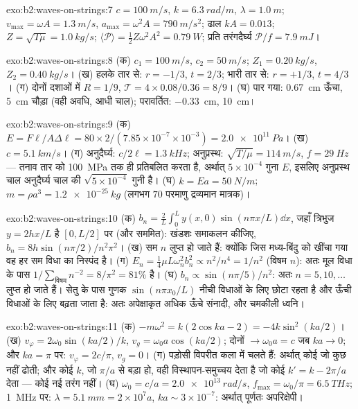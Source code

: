 \begin{solution}{exo:b2:waves-on-strings:7}
$c = \qty{100}{m/s}$, $k = \qty{6.3}{rad/m}$, $\lambda = \qty{1.0}{m}$; $v_{\max} = \omega A =
\qty{1.3}{m/s}$, $a_{\max} = \omega^2A = \qty{790}{m/s^2}$; ढाल $kA = 0.013$; $Z =
\sqrt{T\mu} = \qty{1.0}{kg/s}$; $\langle\mathcal P\rangle = \tfrac12Z\omega^2A^2 = \qty{0.79}{W}$;
प्रति तरंगदैर्घ्य $\mathcal P/f = \qty{7.9}{mJ}$।
\end{solution}

\begin{solution}{exo:b2:waves-on-strings:8}
(क) $c_1 = \qty{100}{m/s}$, $c_2 = \qty{50}{m/s}$; $Z_1 = \qty{0.20}{kg/s}$, $Z_2 = \qty{0.40}{kg/s}$।
(ख) हलके तार से: $r = -1/3$, $t = 2/3$; भारी तार से: $r =
+1/3$, $t = 4/3$। (ग) दोनों दशाओं में $R = 1/9$, $\mathcal T = 4 \times 0.08/0.36 = 8/9$।
(घ) पार गया: \qty{0.67}{cm} ऊँचा, \qty{5}{cm} चौड़ा (वही अवधि, आधी
चाल); परावर्तित: \qty{-0.33}{cm}, \qty{10}{cm}।
\end{solution}

\begin{solution}{exo:b2:waves-on-strings:9}
(क) $E = F\ell/A\Delta\ell = 80 \times 2/(7.85 \times 10^{-7} \times 10^{-3}) = \qty{2.0e11}{Pa}$।
(ख) $c = \qty{5.1}{km/s}$। (ग) अनुदैर्घ्य: $c/2\ell = \qty{1.3}{kHz}$; अनुप्रस्थ:
$\sqrt{T/\mu} = \qty{114}{m/s}$, $f = \qty{29}{Hz}$ --- तनाव तार को
\qty{100}{MPa} तक ही प्रतिबलित करता है, अर्थात् $5 \times 10^{-4}$ गुना $E$, इसलिए अनुप्रस्थ चाल
अनुदैर्घ्य चाल की $\sqrt{5 \times 10^{-4}}$ गुनी है। (घ) $k = Ea = \qty{50}{N/m}$; $m
= \rho a^3 = \qty{1.2e-25}{kg}$ (लगभग $70$ परमाणु द्रव्यमान मात्रक)।
\end{solution}

\begin{solution}{exo:b2:waves-on-strings:10}
(क) $b_n = \frac2L\int_0^Ly(x, 0)\sin(n\pi x/L)\dd x$, जहाँ त्रिभुज $y =
2hx/L$ है $[0, L/2]$ पर (और सममित): खंडशः समाकलन कीजिए, $b_n = 8h\sin(n\pi/2)
/n^2\pi^2$। (ख) सम $n$ लुप्त हो जाते हैं: क्योंकि जिस मध्य-बिंदु को खींचा गया वह
हर सम विधा का निस्पंद है। (ग) $E_n = \tfrac14\mu L\omega_n^2b_n^2 \propto n^2/n^4 = 1/n^2$
(विषम $n$): अतः मूल विधा के पास $1/\sum_{\text{विषम}}n^{-2} = 8/\pi^2 = 81\%$ है। (घ)
$b_n \propto \sin(n\pi/5)/n^2$: अतः $n = 5, 10, \dots$ लुप्त हो जाते हैं। सेतु के पास
गुणक $\sin(n\pi x_0/L)$ नीची विधाओं के लिए छोटा रहता है और ऊँची विधाओं के लिए
बढ़ता जाता है: अतः अपेक्षाकृत अधिक ऊँचे संनादी, और चमकीली ध्वनि।
\end{solution}

\begin{solution}{exo:b2:waves-on-strings:11}
(क) $-m\omega^2 = k(2\cos ka - 2) = -4k\sin^2(ka/2)$। (ख) $v_\varphi = 2\omega_0\sin(ka/2)
/k$, $v_g = \omega_0a\cos(ka/2)$; दोनों $\to \omega_0a = c$ जब $ka \to 0$; और $ka = \pi$ पर:
$v_\varphi = 2c/\pi$, $v_g = 0$। (ग) पड़ोसी विपरीत कला में चलते हैं: अर्थात् कोई  जो कुछ नहीं ढोती; और कोई $k$, जो $\pi/a$ से बड़ा हो, वही विस्थापन-समुच्चय देता है
जो कोई $k' = k - 2\pi/a$ देता --- कोई नई तरंग नहीं। (घ) $\omega_0 = c/a =
\qty{2.0e13}{rad/s}$, $f_{\max} = \omega_0/\pi = \qty{6.5}{THz}$; \qty{1}{MHz} पर: $\lambda =
\qty{5.1}{mm} = 2 \times 10^7a$, $ka \sim 3 \times 10^{-7}$: अर्थात् पूर्णतः अपरिक्षेपी।
\end{solution}

